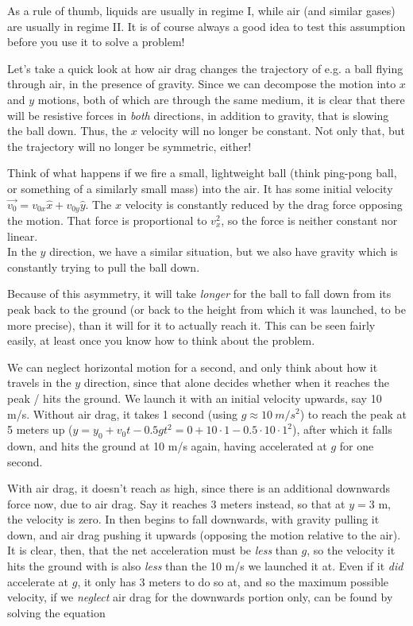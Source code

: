 As a rule of thumb, liquids are usually in regime I, while air (and similar gases) are usually in regime II. It is of course always a good idea to test this assumption before you use it to solve a problem!

Let's take a quick look at how air drag changes the trajectory of e.g. a ball flying through air, in the presence of gravity. Since we can decompose the motion into $x$ and $y$ motions, both of which are through the same medium, it is clear that there will be resistive forces in \emph{both} directions, in addition to gravity, that is slowing the ball down. Thus, the $x$ velocity will no longer be constant. Not only that, but the trajectory will no longer be symmetric, either!

Think of what happens if we fire a small, lightweight ball (think ping-pong ball, or something of a similarly small mass) into the air. It has some initial velocity $\vec{v_0} = v_{0x} \hat{x} + v_{0y} \hat{y}$. The $x$ velocity is constantly reduced by the drag force opposing the motion. That force is proportional to $v_x^2$, so the force is neither constant nor linear.\\
In the $y$ direction, we have a similar situation, but we also have gravity which is constantly trying to pull the ball down.

Because of this asymmetry, it will take \emph{longer} for the ball to fall down from its peak back to the ground (or back to the height from which it was launched, to be more precise), than it will for it to actually reach it. This can be seen fairly easily, at least once you know how to think about the problem.

We can neglect horizontal motion for a second, and only think about how it travels in the $y$ direction, since that alone decides whether when it reaches the peak / hits the ground. We launch it with an initial velocity upwards, say 10 m/s. Without air drag, it takes 1 second (using $g \approx \SI{10}{m/s^2}$) to reach the peak at 5 meters up ($y = y_0 + v_0t - 0.5 g t^2 = 0 + 10\cdot1 - 0.5\cdot10\cdot1^2$), after which it falls down, and hits the ground at 10 m/s again, having accelerated at $g$ for one second.

With air drag, it doesn't reach as high, since there is an additional downwards force now, due to air drag. Say it reaches 3 meters instead, so that at $y = 3$ m, the velocity is zero. In then begins to fall downwards, with gravity pulling it down, and air drag pushing it upwards (opposing the motion relative to the air). It is clear, then, that the net acceleration must be \emph{less} than $g$, so the velocity it hits the ground with is also \emph{less} than the 10 m/s we launched it at. Even if it \emph{did} accelerate at $g$, it only has 3 meters to do so at, and so the maximum possible velocity, if we \emph{neglect} air drag for the downwards portion only, can be found by solving the equation

